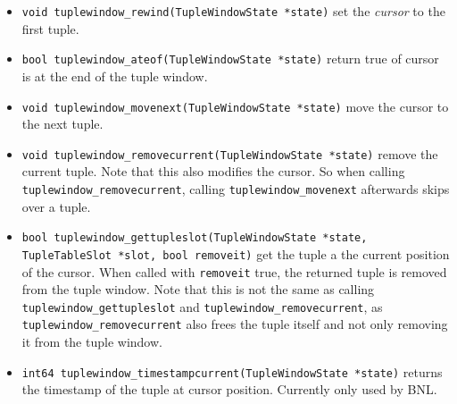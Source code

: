 \begin{itemize}
\item \lstinline|void tuplewindow_rewind(TupleWindowState *state)|
set the \emph{cursor} to the first tuple.

\item \lstinline|bool tuplewindow_ateof(TupleWindowState *state)|
return true of cursor is at the end of the tuple window.

\item \lstinline|void tuplewindow_movenext(TupleWindowState *state)|
move the cursor to the next tuple.

\item \lstinline|void tuplewindow_removecurrent(TupleWindowState *state)|
remove the current tuple.  Note that this also modifies the cursor.
So when calling \lstinline|tuplewindow_removecurrent|, calling
\lstinline|tuplewindow_movenext| afterwards skips over a tuple.

\item \lstinline|bool tuplewindow_gettupleslot(TupleWindowState *state, TupleTableSlot *slot, bool removeit)|
get the tuple a the current position of the cursor.  When called with
\lstinline|removeit| true, the returned tuple is removed from the
tuple window.  Note that this is not the same as calling
\lstinline|tuplewindow_gettupleslot| and
\lstinline|tuplewindow_removecurrent|, as
\lstinline|tuplewindow_removecurrent| also frees the tuple itself and
not only removing it from the tuple window.

\item \lstinline|int64 tuplewindow_timestampcurrent(TupleWindowState *state)|
returns the timestamp of the tuple at cursor position.  Currently only
used by BNL.

\end{itemize}



